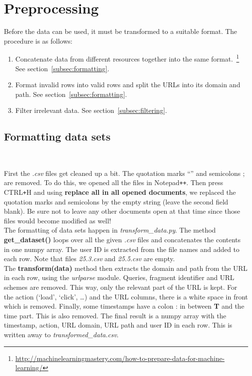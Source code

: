 
\section{Preprocessing}\label{sec:preprocessing}

Before the data can be used, it must be transformed to a suitable format. The procedure is as follows:

\begin{enumerate}
	\item Concatenate data from different resources together into the same format.~\footnote{\url{http://machinelearningmastery.com/how-to-prepare-data-for-machine-learning/}} See section~\ref{subsec:formatting}.
	\item Format invalid rows into valid rows and split the URLs into its domain and path. See section~\ref{subsec:formatting}.
	\item Filter irrelevant data. See section~\ref{subsec:filtering}.
\end{enumerate}

\subsection{Formatting data sets}~\label{subsec:formatting}

First the \textit{.csv} files get cleaned up a bit. The quotation marks ``'' and semicolons ; are removed. To do this, we opened all the files in Notepad\verb!++!. Then press CTRL\verb!+!H and using \textbf{replace all in all opened documents}, we replaced the quotation marks and semicolons by the empty string (leave the second field blank). Be sure not to leave any other documents open at that time since those files would become modified as well!
\\[2ex]
The formatting of data sets happen in \textit{transform\_data.py}. The method \textbf{get\_dataset()} loops over all the given \textit{.csv} files and concatenates the contents in one numpy array. The user ID is extracted from the file names and added to each row. Note that files \textit{25.3.csv} and \textit{25.5.csv} are empty.
\\[2ex]
The \textbf{transform(data)} method then extracts the domain and path from the URL in each row, using the \textit{urlparse} module. Queries, fragment identifier and URL schemes are removed. This way, only the relevant part of the URL is kept. For the action (`load', `click', \ldots) and the URL columns, there is a white space in front which is removed. Finally, some timestamps have a colon : in between \textbf{T} and the time part. This is also removed. The final result is a numpy array with the timestamp, action, URL domain, URL path and user ID in each row. This is written away to \textit{transformed\_data.csv}.


